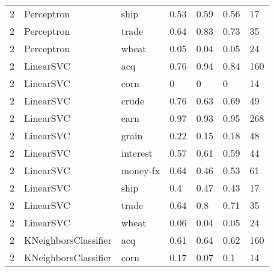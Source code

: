 \documentclass{article}
\begin{document}
\begin{table}[h]
\begin{tabular}{lllllll}
2             & Perceptron             & ship            & 0.53               & 0.59            & 0.56              & 17               \\
2             & Perceptron             & trade           & 0.64               & 0.83            & 0.73              & 35               \\
2             & Perceptron             & wheat           & 0.05               & 0.04            & 0.05              & 24               \\
2             & LinearSVC              & acq             & 0.76               & 0.94            & 0.84              & 160              \\
2             & LinearSVC              & corn            & 0                  & 0               & 0                 & 14               \\
2             & LinearSVC              & crude           & 0.76               & 0.63            & 0.69              & 49               \\
2             & LinearSVC              & earn            & 0.97               & 0.93            & 0.95              & 268              \\
2             & LinearSVC              & grain           & 0.22               & 0.15            & 0.18              & 48               \\
2             & LinearSVC              & interest        & 0.57               & 0.61            & 0.59              & 44               \\
2             & LinearSVC              & money-fx        & 0.64               & 0.46            & 0.53              & 61               \\
2             & LinearSVC              & ship            & 0.4                & 0.47            & 0.43              & 17               \\
2             & LinearSVC              & trade           & 0.64               & 0.8             & 0.71              & 35               \\
2             & LinearSVC              & wheat           & 0.06               & 0.04            & 0.05              & 24               \\
2             & KNeighborsClassifier   & acq             & 0.61               & 0.64            & 0.62              & 160              \\
2             & KNeighborsClassifier   & corn            & 0.17               & 0.07            & 0.1               & 14               \\

\end{tabular}
\end{table}
\end{document}
